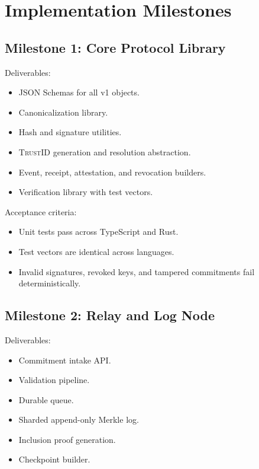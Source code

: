 \documentclass[11pt]{article}
\newcommand{\TrustID}{\textsc{TrustID}}
\begin{document}
\section{Implementation Milestones}

\subsection{Milestone 1: Core Protocol Library}

Deliverables:

\begin{itemize}
    \item JSON Schemas for all v1 objects.
    \item Canonicalization library.
    \item Hash and signature utilities.
    \item \TrustID{} generation and resolution abstraction.
    \item Event, receipt, attestation, and revocation builders.
    \item Verification library with test vectors.
\end{itemize}

Acceptance criteria:

\begin{itemize}
    \item Unit tests pass across TypeScript and Rust.
    \item Test vectors are identical across languages.
    \item Invalid signatures, revoked keys, and tampered commitments fail deterministically.
\end{itemize}

\subsection{Milestone 2: Relay and Log Node}

Deliverables:

\begin{itemize}
    \item Commitment intake API.
    \item Validation pipeline.
    \item Durable queue.
    \item Sharded append-only Merkle log.
    \item Inclusion proof generation.
    \item Checkpoint builder.
\end{itemize}
\end{document}
